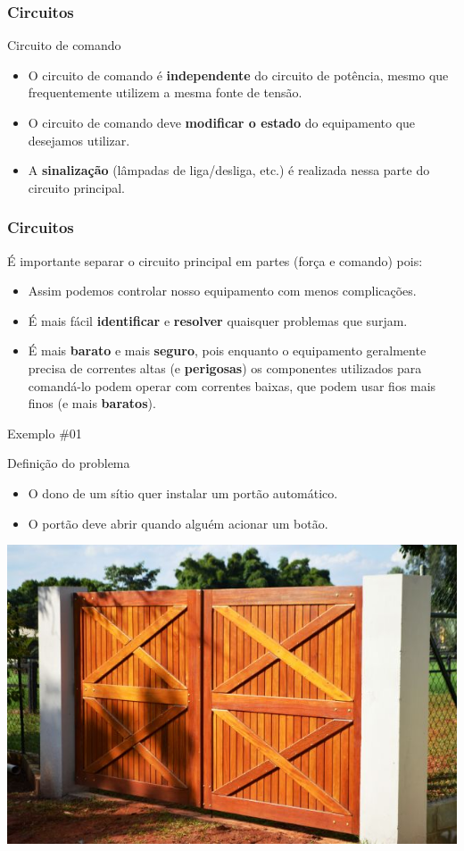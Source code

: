 \begin{frame}
	\frametitle{Circuitos}
	\begin{block}{Circuito de comando}
		\begin{itemize}
			\item O circuito de comando é \textbf{independente} do circuito de potência, mesmo que frequentemente utilizem a mesma fonte de tensão.
			\item O circuito de comando deve \textbf{modificar o estado} do equipamento que desejamos utilizar.
			\item A \textbf{sinalização} (lâmpadas de liga/desliga, etc.) é realizada nessa parte do circuito principal.
		\end{itemize}
	\end{block}
\end{frame}

\begin{frame}
	\frametitle{Circuitos}
	\begin{block}{}
		É importante separar o circuito principal em partes (força e comando) pois:
		\begin{itemize}
			\item Assim podemos controlar nosso equipamento com menos complicações.
			\item É mais fácil \textbf{identificar} e \textbf{resolver} quaisquer problemas que surjam.
			\item É mais \textbf{barato} e mais \textbf{seguro}, pois enquanto o equipamento geralmente precisa de correntes altas (e \textbf{perigosas}) os componentes utilizados para comandá-lo podem operar com correntes baixas, que podem usar fios mais finos (e mais \textbf{baratos}).
		\end{itemize}
	\end{block}
\end{frame}

\begin{frame}{Exemplo \#01}
	\begin{block}{Definição do problema}
		\begin{itemize}
			\item O dono de um sítio quer instalar um portão automático.
			\item O portão deve abrir quando alguém acionar um botão.
		\end{itemize}
	\end{block}
	\centerline{\includegraphics[width=0.7\linewidth]{Figuras/Ch05/fig5.jpg}}
\end{frame}

